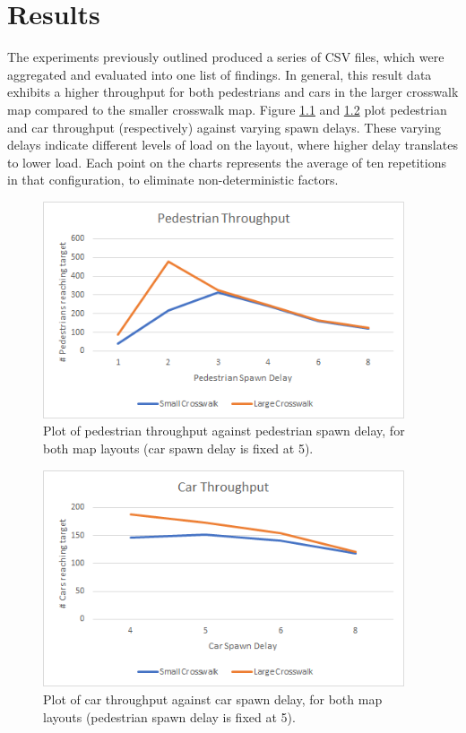\chapter{Results} \label{chap:results}

The experiments previously outlined produced a series of CSV files, which were aggregated and evaluated into one list of findings. In general, this result data exhibits a higher throughput for both pedestrians and cars in the larger crosswalk map compared to the smaller crosswalk map. Figure \ref{fig:plot-pedestrian-throughput} and \ref{fig:plot-car-throughput} plot pedestrian and car throughput (respectively) against varying spawn delays. These varying delays indicate different levels of load on the layout, where higher delay translates to lower load. Each point on the charts represents the average of ten repetitions in that configuration, to eliminate non-deterministic factors.

\begin{figure}[h]
    \centering
    \includegraphics[width=4.2in]{images/plot-pedestrian-throughput.png}
    \caption{Plot of pedestrian throughput against pedestrian spawn delay, for both map layouts (car spawn delay is fixed at 5).}
    \label{fig:plot-pedestrian-throughput}
\end{figure}

\begin{figure}[h]
    \centering
    \includegraphics[width=4.2in]{images/plot-car-throughput.png}
    \caption{Plot of car throughput against car spawn delay, for both map layouts (pedestrian spawn delay is fixed at 5).}
    \label{fig:plot-car-throughput}
\end{figure}

